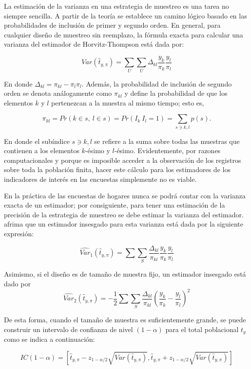 \documentclass[
  12pt,
  spanish,
]{book}
\begin{document}
La estimación de la varianza en una estrategia de muestreo es una tarea no siempre sencilla. A partir de la teoría se establece un camino lógico basado en las probabilidades de inclusión de primer y segundo orden. En general, para cualquier diseño de muestreo sin reemplazo, la fórmula exacta para calcular una varianza del estimador de Horvitz-Thompson está dada por:

\[Var(\hat{t}_{y,\pi}) = \sum_U\sum_U \Delta_{kl}\frac{y_k}{\pi_k}\frac{y_l}{\pi_l}\]

En donde \(\Delta_{kl} = \pi_{kl} - \pi_l \pi_l\). Además, la probabilidad de inclusión de segundo orden se denota análogamente como \(\pi_{kl}\) y define la probabilidad de que los elementos \(k\) y \(l\) pertenezcan a la muestra al mismo tiempo; esto es,

\[
\pi_{kl}=Pr(k\in s, \  l\in s)=Pr(I_k\ I_l=1)=\sum_{s \ni k, l} p(s).
\]

En donde el subíndice \({s \ni k, l}\) se refiere a la suma sobre todas las muestras que contienen a los elementos \(k\)-ésimo y \(l\)-ésimo. Evidentemente, por razones computacionales y porque es imposible acceder a la observación de los registros sobre toda la población finita, hacer este cálculo para los estimadores de los indicadores de interés en las encuestas simplemente no es viable.

En la práctica de las encuestas de hogares nunca se podrá contar con la varianza exacta de un estimador; por consiguiente, para tener una estimación de la precisión de la estrategia de muestreo se debe estimar la varianza del estimador. \citet{Gutierrez_2016} afrima que un estimador insesgado para esta varianza está dada por la siguiente expresión:

\[
\widehat{Var}_1(\hat{t}_{y,\pi})=\sum\sum_S \dfrac{\Delta_{kl}}{\pi_{kl}}\frac{y_k}{\pi_k}\frac{y_l}{\pi_l}
\]

Asimismo, si el diseño es de tamaño de muestra fijo, un estimador insesgado está dado por
\[
\widehat{Var}_2(\hat{t}_{y,\pi})=-\frac{1}{2}\sum\sum_S\frac{\Delta_{kl}}{\pi_{kl}}\left(\frac{y_k}{\pi_k}-\frac{y_l}{\pi_l}\right)^2
\]

De esta forma, cuando el tamaño de muestra es suficientemente grande, se puede construir un intervalo de confianza de nivel \((1-\alpha)\) para el total poblacional \(t_y\) como se indica a continuación:

\[
IC(1-\alpha)=\left[\hat{t}_{y,\pi}-z_{1-\alpha / 2}\sqrt{ Var(\hat{t}_{y,\pi})},\hat{t}_{y,\pi}+z_{1-\alpha / 2}\sqrt{Var(\hat{t}_{y,\pi})}\right]
\]
\end{document}
